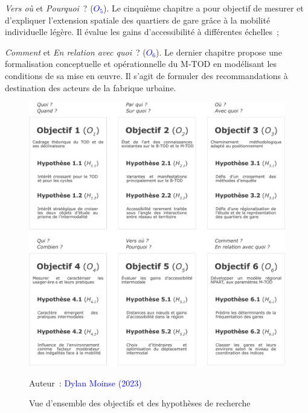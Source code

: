 \begin{refsegment}
\begin{customitemize}
    \item \textsl{Vers où} et \textsl{Pourquoi}~? ({\textcolor{blue}{\(O_5\)}\label{objectif-5}}). Le cinquième chapitre a pour objectif de mesurer et d'expliquer l'extension spatiale des quartiers de gare grâce à la mobilité individuelle légère. Il évalue les gains d'accessibilité à différentes échelles~;
    \item \textsl{Comment} et \textsl{En relation avec quoi}~? ({\textcolor{blue}{\(O_6\)}\label{objectif-6}}). Le dernier chapitre propose une formalisation conceptuelle et opérationnelle du \acrshort{M-TOD} en modélisant les conditions de sa mise en œuvre. Il s’agit de formuler des recommandations à destination des acteurs de la fabrique urbaine.
        \end{customitemize}%

    \begin{figure}[h!]\vspace*{4pt}
        \caption{Vue d'ensemble des objectifs et des hypothèses de recherche}
        \label{fig-introduction:objectifs-hypotheses}
        \centerline{\includegraphics[width=1\columnwidth]{src/Figures/Introduction/FR_Objectifs_recherche.pdf}}
        \vspace{5pt}
        \begin{flushright}\scriptsize{
        Auteur~: \textcolor{blue}{Dylan Moinse (2023)}
        }\end{flushright}
    \end{figure}


\end{refsegment}
